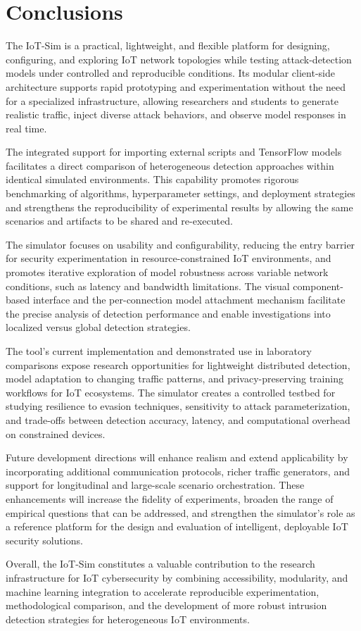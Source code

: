 \section{Conclusions}
\label{sec:Conclusions}
The IoT-Sim is a practical, lightweight, and flexible platform for designing, configuring, and exploring IoT network topologies while testing attack-detection models under controlled and reproducible conditions. Its modular client-side architecture supports rapid prototyping and experimentation without the need for a specialized infrastructure, allowing researchers and students to generate realistic traffic, inject diverse attack behaviors, and observe model responses in real time.

The integrated support for importing external scripts and TensorFlow models facilitates a direct comparison of heterogeneous detection approaches within identical simulated environments. This capability promotes rigorous benchmarking of algorithms, hyperparameter settings, and deployment strategies and strengthens the reproducibility of experimental results by allowing the same scenarios and artifacts to be shared and re-executed.

The simulator focuses on usability and configurability, reducing the entry barrier for security experimentation in resource-constrained IoT environments, and promotes iterative exploration of model robustness across variable network conditions, such as latency and bandwidth limitations. The visual component-based interface and the per-connection model attachment mechanism facilitate the precise analysis of detection performance and enable investigations into localized versus global detection strategies.

The tool’s current implementation and demonstrated use in laboratory comparisons expose research opportunities for lightweight distributed detection, model adaptation to changing traffic patterns, and privacy-preserving training workflows for IoT ecosystems. The simulator creates a controlled testbed for studying resilience to evasion techniques, sensitivity to attack parameterization, and trade-offs between detection accuracy, latency, and computational overhead on constrained devices.

Future development directions will enhance realism and extend applicability by incorporating additional communication protocols, richer traffic generators, and support for longitudinal and large-scale scenario orchestration. These enhancements will increase the fidelity of experiments, broaden the range of empirical questions that can be addressed, and strengthen the simulator’s role as a reference platform for the design and evaluation of intelligent, deployable IoT security solutions.

Overall, the IoT-Sim constitutes a valuable contribution to the research infrastructure for IoT cybersecurity by combining accessibility, modularity, and machine learning integration to accelerate reproducible experimentation, methodological comparison, and the development of more robust intrusion detection strategies for heterogeneous IoT environments.
